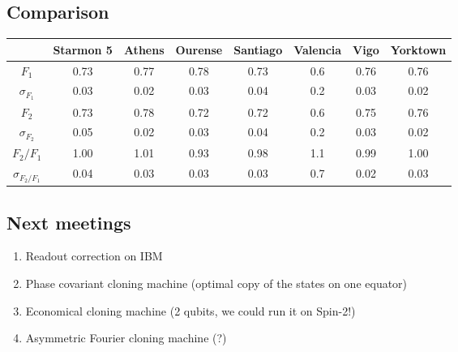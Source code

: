 \documentclass[11pt]{article}
\begin{document}
\subsection{Comparison}
\begin{table}[H]
    \centering
    \begin{tabular}{|c|c|c|c|c|c|c|c|}
    \hline
    \textbf{} & \textbf{Starmon 5} & \textbf{Athens} & \textbf{Ourense} & \textbf{Santiago} & \textbf{Valencia} & \textbf{Vigo} & \textbf{Yorktown} \\ \hline
    $F_1$              & 0.73 & 0.77 & 0.78 & 0.73 & 0.6 & 0.76 & 0.76 \\ \hline
    $\sigma_{F_1}$     & 0.03 & 0.02 & 0.03 & 0.04 & 0.2 & 0.03 & 0.02 \\ \hline
    $F_2$              & 0.73 & 0.78 & 0.72 & 0.72 & 0.6 & 0.75 & 0.76 \\ \hline
    $\sigma_{F_2}$     & 0.05 & 0.02 & 0.03 & 0.04 & 0.2 & 0.03 & 0.02 \\ \hline
    $F_2/F_1$          & 1.00 & 1.01 & 0.93 & 0.98 & 1.1 & 0.99 & 1.00 \\ \hline
    $\sigma_{F_2/F_1}$ & 0.04 & 0.03 & 0.03 & 0.03 & 0.7 & 0.02 & 0.03 \\ \hline
    \end{tabular}
    \end{table}
\subsection{Next meetings}
\begin{enumerate}
    \item Readout correction on IBM
    \item Phase covariant cloning machine (optimal copy of the states on one equator)
    \item Economical cloning machine (2 qubits, we could run it on Spin-2!)
    \item Asymmetric Fourier cloning machine (?)
\end{enumerate}
\end{document}
